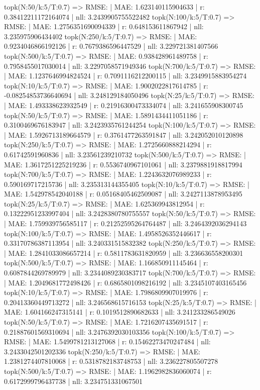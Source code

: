 topk(N:50/k:5/T:0.7) => RMSE: | MAE: 1.623140115904633 | r: 0.38412211172164074 | nll: 3.2439905755522482
topk(N:100/k:5/T:0.7) => RMSE: | MAE: 1.2756351690094339 | r: 0.648153611867942 | nll: 3.235975906434402
topk(N:250/k:5/T:0.7) => RMSE: | MAE: 0.9234046866192126 | r: 0.7679386596447529 | nll: 3.229721381407566
topk(N:500/k:5/T:0.7) => RMSE: | MAE: 0.938428961489758 | r: 0.7958455017030014 | nll: 3.2297058571949346
topk(N:700/k:5/T:0.7) => RMSE: | MAE: 1.1237646994824524 | r: 0.7091116212200115 | nll: 3.2349915883954274
topk(N:10/k:5/T:0.7) => RMSE: | MAE: 1.9002022817614785 | r: -0.08254853736640694 | nll: 3.248129184050496
topk(N:25/k:5/T:0.7) => RMSE: | MAE: 1.493338623932549 | r: 0.21916300473334074 | nll: 3.241655908300745
topk(N:50/k:5/T:0.7) => RMSE: | MAE: 1.5891434411051186 | r: 0.3100469676183947 | nll: 3.2423935761244254
topk(N:100/k:5/T:0.7) => RMSE: | MAE: 1.5926713189664579 | r: 0.3761477263591847 | nll: 3.242052010120898
topk(N:250/k:5/T:0.7) => RMSE: | MAE: 1.2725660888214294 | r: 0.61742591960836 | nll: 3.23561239210732
topk(N:500/k:5/T:0.7) => RMSE: | MAE: 1.3617251225219236 | r: 0.5536740967101061 | nll: 3.2379881918817994
topk(N:700/k:5/T:0.7) => RMSE: | MAE: 1.2243632076989233 | r: 0.590169717215736 | nll: 3.235313144355405
topk(N:10/k:5/T:0.7) => RMSE: | MAE: 1.542978542040188 | r: 0.05168405462509087 | nll: 3.2427113878953495
topk(N:25/k:5/T:0.7) => RMSE: | MAE: 1.625369943812954 | r: 0.13222951233997404 | nll: 3.2428380780755557
topk(N:50/k:5/T:0.7) => RMSE: | MAE: 1.759939756585117 | r: 0.21252595264764487 | nll: 3.2464392036294143
topk(N:100/k:5/T:0.7) => RMSE: | MAE: 1.4958526352446617 | r: 0.33170786387113954 | nll: 3.240331515832382
topk(N:250/k:5/T:0.7) => RMSE: | MAE: 1.2841033086657214 | r: 0.5811783631820959 | nll: 3.236636558200301
topk(N:500/k:5/T:0.7) => RMSE: | MAE: 1.166850911145464 | r: 0.6087844269789979 | nll: 3.2344089230383717
topk(N:700/k:5/T:0.7) => RMSE: | MAE: 1.2049681772498426 | r: 0.6865801098216192 | nll: 3.2345107403165456
topk(N:10/k:5/T:0.7) => RMSE: | MAE: 1.7986809907019976 | r: 0.20413360449713272 | nll: 3.246568615716153
topk(N:25/k:5/T:0.7) => RMSE: | MAE: 1.604166247315141 | r: 0.1019512890682633 | nll: 3.241233286549026
topk(N:50/k:5/T:0.7) => RMSE: | MAE: 1.7216207435691517 | r: 0.21887601569310694 | nll: 3.2476392030103356
topk(N:100/k:5/T:0.7) => RMSE: | MAE: 1.5499781213127068 | r: 0.15462273470247484 | nll: 3.2433042501202336
topk(N:250/k:5/T:0.7) => RMSE: | MAE: 1.2381274407810068 | r: 0.5318782183748753 | nll: 3.236227805507278
topk(N:500/k:5/T:0.7) => RMSE: | MAE: 1.1962982836060074 | r: 0.6172999796437738 | nll: 3.234751331067501
